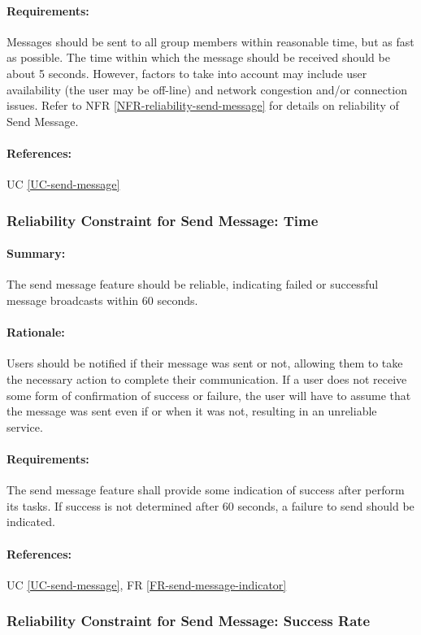 \documentclass[11pt]{article}
\begin{document}
\paragraph{Requirements:} Messages should be sent to all group members within reasonable time, but as fast as possible. The time within which the message should be received should be about 5 seconds. However, factors to take into account may include user availability (the user may be off-line) and network congestion and/or connection issues. Refer to NFR \ref{NFR-reliability-send-message} for details on reliability of Send Message.
\paragraph{References:} UC \ref{UC-send-message}

\subsubsection{Reliability Constraint for Send Message: Time} \label{NFR-reliability-send-message-1}
\paragraph{Summary:} The send message feature should be reliable, indicating failed or successful message broadcasts within 60 seconds.
\paragraph{Rationale:} Users should be notified if their message was sent or not, allowing them to take the necessary action to complete their communication. If a user does not receive some form of confirmation of success or failure, the user will have to assume that the message was sent even if or when it was not, resulting in an unreliable service.
\paragraph{Requirements:} The send message feature shall provide some indication of success after perform its tasks. If success is not determined after 60 seconds, a failure to send should be indicated.
\paragraph{References:} UC \ref{UC-send-message}, FR \ref{FR-send-message-indicator}

\subsubsection{Reliability Constraint for Send Message: Success Rate} \label{NFR-reliability-send-message-2}
\end{document}
